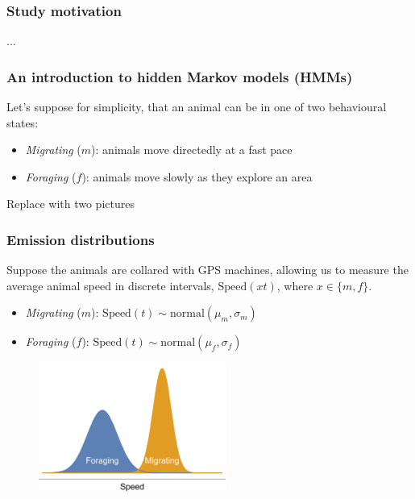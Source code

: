 \documentclass[main.tex]{subfiles}
\begin{document}
\begin{frame}
\frametitle{Study motivation}

...
    
\end{frame}

\begin{frame}
\frametitle{An introduction to hidden Markov models (HMMs)}

Let's suppose for simplicity, that an animal can be in one of two behavioural states:

\vspace{0.5cm}

\begin{itemize}
    \item \textit{Migrating} ($m$): animals move directedly at a fast pace
    \item \textit{Foraging} ($f$): animals move slowly as they explore an area
\end{itemize}

\vspace{0.5cm}

Replace with two pictures
    
\end{frame}

\begin{frame}
\frametitle{Emission distributions}
Suppose the animals are collared with GPS machines, allowing us to measure the average animal speed in discrete intervals, $\text{Speed}(xt)$, where $x\in\{m,f\}$.

\vspace{0.5cm}

\begin{itemize}
    \item \textit{Migrating} ($m$): $\text{Speed}(t)\sim \text{normal}(\mu_m,\sigma_m)$
    \item \textit{Foraging} ($f$): $\text{Speed}(t)\sim \text{normal}(\mu_f,\sigma_f)$
\end{itemize}

\begin{figure}
    \centering
    \includegraphics[width=0.55\textwidth]{figures/foraging_migrating.pdf}
\end{figure}
    
\end{frame}
\end{document}
